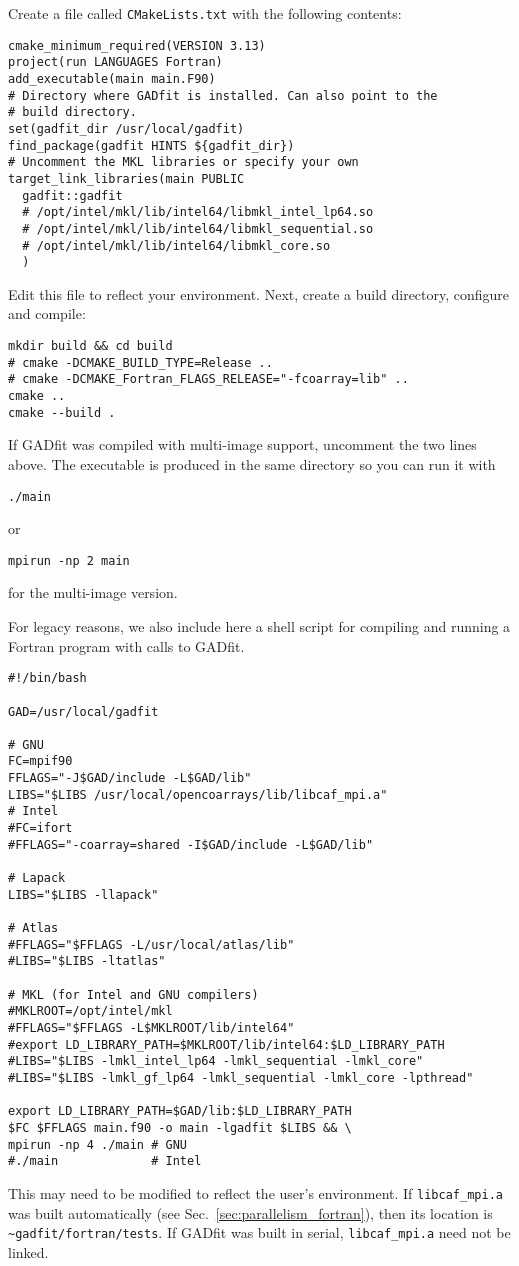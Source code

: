 \documentclass{article}
\begin{document}
Create a file called \verb+CMakeLists.txt+ with the following contents:
\begin{verbatim}
cmake_minimum_required(VERSION 3.13)
project(run LANGUAGES Fortran)
add_executable(main main.F90)
# Directory where GADfit is installed. Can also point to the
# build directory.
set(gadfit_dir /usr/local/gadfit)
find_package(gadfit HINTS ${gadfit_dir})
# Uncomment the MKL libraries or specify your own
target_link_libraries(main PUBLIC
  gadfit::gadfit
  # /opt/intel/mkl/lib/intel64/libmkl_intel_lp64.so
  # /opt/intel/mkl/lib/intel64/libmkl_sequential.so
  # /opt/intel/mkl/lib/intel64/libmkl_core.so
  )
\end{verbatim}
Edit this file to reflect your environment. Next, create a build directory, configure and compile:
\begin{verbatim}
mkdir build && cd build
# cmake -DCMAKE_BUILD_TYPE=Release ..
# cmake -DCMAKE_Fortran_FLAGS_RELEASE="-fcoarray=lib" ..
cmake ..
cmake --build .
\end{verbatim}
If GADfit was compiled with multi-image support, uncomment the two lines above. The executable is produced in the same directory so you can run it with
\begin{verbatim}
./main
\end{verbatim}
or
\begin{verbatim}
mpirun -np 2 main
\end{verbatim}
for the multi-image version.

For legacy reasons, we also include here a shell script for compiling and running a Fortran program with calls to GADfit.
\begin{verbatim}
#!/bin/bash

GAD=/usr/local/gadfit

# GNU
FC=mpif90
FFLAGS="-J$GAD/include -L$GAD/lib"
LIBS="$LIBS /usr/local/opencoarrays/lib/libcaf_mpi.a"
# Intel
#FC=ifort
#FFLAGS="-coarray=shared -I$GAD/include -L$GAD/lib"

# Lapack
LIBS="$LIBS -llapack"

# Atlas
#FFLAGS="$FFLAGS -L/usr/local/atlas/lib"
#LIBS="$LIBS -ltatlas"

# MKL (for Intel and GNU compilers)
#MKLROOT=/opt/intel/mkl
#FFLAGS="$FFLAGS -L$MKLROOT/lib/intel64"
#export LD_LIBRARY_PATH=$MKLROOT/lib/intel64:$LD_LIBRARY_PATH
#LIBS="$LIBS -lmkl_intel_lp64 -lmkl_sequential -lmkl_core"
#LIBS="$LIBS -lmkl_gf_lp64 -lmkl_sequential -lmkl_core -lpthread"

export LD_LIBRARY_PATH=$GAD/lib:$LD_LIBRARY_PATH
$FC $FFLAGS main.f90 -o main -lgadfit $LIBS && \
mpirun -np 4 ./main # GNU
#./main             # Intel
\end{verbatim}
This may need to be modified to reflect the user's environment. If \verb+libcaf_mpi.a+ was built automatically (see Sec.~\ref{sec:parallelism_fortran}), then its location is \\ \verb+~gadfit/fortran/tests+. If GADfit was built in serial, \verb+libcaf_mpi.a+ need not be linked.
\end{document}
